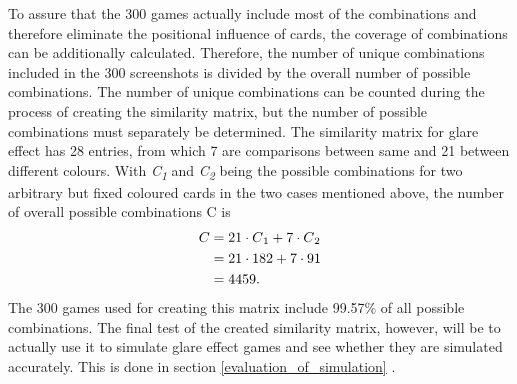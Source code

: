 To assure that the 300 games actually include most of the combinations and therefore eliminate the positional influence of cards, the coverage of combinations can be additionally calculated. Therefore, the number of unique combinations included in the 300 screenshots is divided by the overall number of possible combinations. The number of unique combinations can be counted during the process of creating the similarity matrix, but the number of possible combinations must separately be determined. The similarity matrix for glare effect has 28 entries, from which 7 are comparisons between same and 21 between different colours. With \textit{C\textsubscript{1}} and \textit{C\textsubscript{2}}  being the possible combinations for two arbitrary but fixed coloured cards in the two cases mentioned above, the number of overall possible combinations C is
\begin{align*}
	C &= 21 \cdot C\textsubscript{1} + 7 \cdot C\textsubscript{2}\\
	&= 21 \cdot 182 + 7 \cdot 91\\
	&= 4459. 
\end{align*}
The 300 games used for creating this matrix include 99.57\% of all possible combinations. The final test of the created similarity matrix, however, will be to actually use it to simulate glare effect games and see whether they are simulated accurately. This is done in section \ref{evaluation_of_simulation} . 


\newpage

